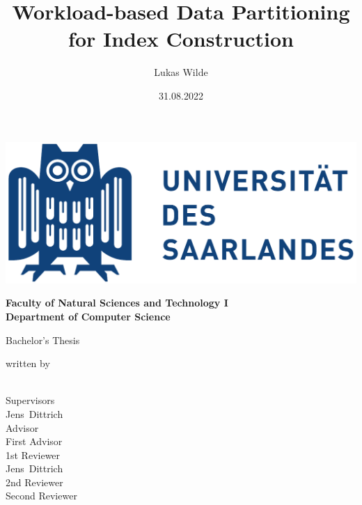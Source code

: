 \documentclass[11pt,a4paper,twoside,titlepage,british]{report}
\author{Lukas Wilde}
\date{31.08.2022}
\title{Workload-based Data Partitioning for Index Construction}
\makeatletter
\let\runauthor\@author
\let\runtitle\@title
\let\rundate\@date
\makeatother
\begin{document}
\begin{titlepage}
    \begin{center}
        \includegraphics[scale=.5]{figures/logo.pdf}

        \bfseries
        \vspace{2em}
        Faculty of Natural Sciences and Technology I \\
        Department of Computer Science

        \vspace{2cm}
        \begin{doublespace}
            {\LARGE \runtitle}
        \end{doublespace}

        \vspace{1cm} 
        {\large Bachelor's Thesis}

        \vfill
        {\normalfont written by}
        \\[1em]
        {\Large \runauthor}
        \\[1em]
        \textbf{\printdate{\rundate}}

        \vfill
        {\normalfont Supervisors}
        \\
        {\large Jens~Dittrich}
        \\[.5em]
        {\normalfont Advisor}
        \\
        {\large First Advisor}
        \\[.5em]
        {\normalfont 1st Reviewer}
        \\
        {\large Jens~Dittrich}
        \\[.5em]
        {\normalfont 2nd Reviewer}
        \\
        {\large Second Reviewer}
    \end{center}
\end{titlepage}
\setcounter{page}{2}

\end{document}
